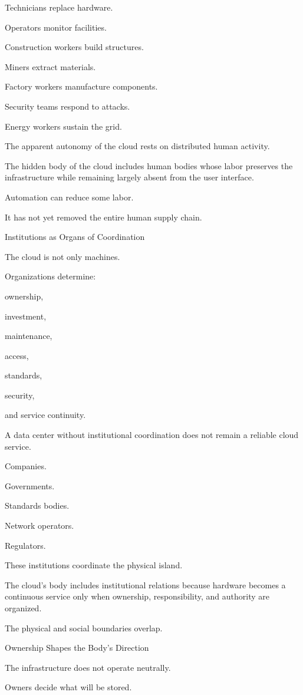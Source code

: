 Technicians replace hardware.

Operators monitor facilities.

Construction workers build structures.

Miners extract materials.

Factory workers manufacture components.

Security teams respond to attacks.

Energy workers sustain the grid.

The apparent autonomy of the cloud rests on distributed human activity.

The hidden body of the cloud includes human bodies whose labor preserves the infrastructure while remaining largely absent from the user interface.

Automation can reduce some labor.

It has not yet removed the entire human supply chain.

Institutions as Organs of Coordination

The cloud is not only machines.

Organizations determine:

ownership,

investment,

maintenance,

access,

standards,

security,

and service continuity.

A data center without institutional coordination does not remain a reliable cloud service.

Companies.

Governments.

Standards bodies.

Network operators.

Regulators.

These institutions coordinate the physical island.

The cloud’s body includes institutional relations because hardware becomes a continuous service only when ownership, responsibility, and authority are organized.

The physical and social boundaries overlap.

Ownership Shapes the Body’s Direction

The infrastructure does not operate neutrally.

Owners decide what will be stored.

